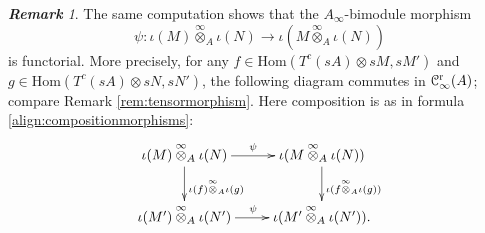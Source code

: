 \documentclass[a4paper, 11pt]{amsart}
\theoremstyle{definition}
\theoremstyle{remark}
\newtheorem{rem}[thm]{\bf Remark}
\numberwithin{equation}{section}
\newcommand{\RR}{\mathrm{r}}
\newcommand{\Hom}{\mathrm{Hom}}
\newcommand{\EC}{\EuScript{C}}
\begin{document}
\begin{rem}
The same computation shows that the $A_\infty$-bimodule morphism
$$\psi\colon \iota(M)\overset{\infty}{\otimes}_A \iota(N) \to \iota(M\overset{\infty}{\otimes}_A \iota(N))$$
is functorial. More precisely, for any $f\in \Hom(T^c(sA) \otimes sM , sM')$ and $g\in \Hom(T^c(sA) \otimes sN , sN')$, the following diagram commutes in $\EC^{\RR}_\infty(A)$; compare Remark \ref{rem:tensormorphism}. Here composition is as in formula \eqref{align:compositionmorphisms}:
$$
\xymatrix{
\iota(M)\overset{\infty}{\otimes}_A \iota(N)\ar[r]^{\psi} \ar[d]^{\iota(f)\overset{\infty}{\otimes}_A \iota(g)} & \iota(M\overset{\infty}{\otimes}_A \iota(N)) \ar[d]^{\iota(f\overset{\infty}{\otimes}_A \iota(g))}\\
\iota(M')\overset{\infty}{\otimes}_A \iota(N') \ar[r]^{\psi} & \iota(M'\overset{\infty}{\otimes}_A \iota(N')) .
}$$
\end{rem}
\end{document}
